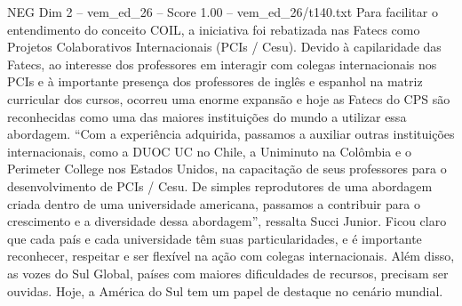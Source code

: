 \begin{textsample}{NEG Dim 2 – vem\_ed\_26 – Score 1.00 – vem\_ed\_26/t140.txt}
Para facilitar o entendimento do conceito COIL, a iniciativa foi rebatizada nas Fatecs como Projetos Colaborativos Internacionais (PCIs / Cesu).
Devido à capilaridade das Fatecs, ao interesse dos professores em interagir com colegas internacionais nos PCIs e à importante presença dos professores de inglês e espanhol na matriz curricular dos cursos, ocorreu uma enorme expansão e hoje as Fatecs do CPS são reconhecidas como uma das maiores instituições do mundo a utilizar essa abordagem. “Com a experiência adquirida, passamos a auxiliar outras instituições internacionais, como a DUOC UC no Chile, a Uniminuto na Colômbia e o Perimeter College nos Estados Unidos, na capacitação de seus professores para o desenvolvimento de PCIs / Cesu.
De simples reprodutores de uma abordagem criada dentro de uma universidade americana, passamos a contribuir para o crescimento e a diversidade dessa abordagem”, ressalta Succi Junior.
Ficou claro que cada país e cada universidade têm suas particularidades, e é importante reconhecer, respeitar e ser flexível na ação com colegas internacionais.
Além disso, as vozes do Sul Global, países com maiores dificuldades de recursos, precisam ser ouvidas.
Hoje, a América do Sul tem um papel de destaque no cenário mundial.

\end{textsample}
